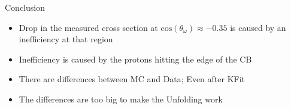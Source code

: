 \documentclass[
		10pt
		]{beamer}
\begin{document}
\begin{frame}{Conclusion}
	\begin{itemize}
		\item Drop in the measured cross section at $\textrm{cos}(\theta_{\omega}) \approx -0.35$ is caused by an inefficiency at that region
		\item Inefficiency is caused by the protons hitting the edge of the CB
		\item There are differences between MC and Data; Even after KFit
		\item The differences are too big to make the Unfolding work
		
	\end{itemize}
	
	
\end{frame}
\end{document}
